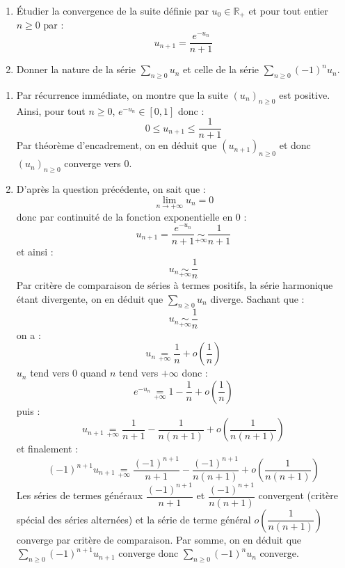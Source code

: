 \documentclass[a4paper,10pt]{report}
\newcommand{\Sum}[2]{\ensuremath{\textstyle{\sum\limits_{#1}^{#2}}}}
\begin{document}
\medskip

\begin{Exa}  
\begin{enumerate}
\item Étudier la convergence de la suite définie par $u_0 \in \mathbb{R}_+$ et pour tout entier $n \geq 0$ par :
 \[
u_{n + 1} = \frac{e^{ - u_n}}{n + 1}
 \]
\item Donner la nature de la série $\Sum{n \geq 0}{} u_n$ et celle de la série $\Sum{n \geq 0}{} (-1)^n u_n$.
\end{enumerate}
\end{Exa}

\corr 

\begin{enumerate}
\item Par récurrence immédiate, on montre que la suite $(u_n)_{n \geq 0}$ est positive. Ainsi, pour tout $n \geq 0$, $e^{-u_n} \in [0,1]$ donc :
$$ 0 \leq u_{n+1} \leq \dfrac{1}{n+1}$$
Par théorème d'encadrement, on en déduit que $(u_{n+1})_{n \geq 0}$ et donc $(u_n)_{n \geq 0}$ converge vers $0$.
\item D'après la question précédente, on sait que :
$$ \lim_{n \rightarrow + \infty} u_n = 0$$
donc par continuité de la fonction exponentielle en $0$ :
$$ u_{n+1} = \dfrac{e^{-u_n}}{n+1} \underset{+ \infty}{\sim} \dfrac{1}{n+1}$$
et ainsi :
$$ u_n \underset{+ \infty}{\sim} \dfrac{1}{n}$$
Par critère de comparaison de séries à termes positifs, la série harmonique étant divergente, on en déduit que $\Sum{n \geq 0}{} u_n$ diverge. Sachant que :
$$  u_n \underset{+ \infty}{\sim} \dfrac{1}{n}$$
on a :
$$ u_n \underset{+\infty}{=} \dfrac{1}{n} + o \left( \dfrac{1}{n} \right)$$
$u_n$ tend vers $0$ quand $n$ tend vers $+ \infty$ donc :
$$ e^{-u_n} \underset{+\infty}{=} 1 -\dfrac{1}{n} + o \left( \dfrac{1}{n} \right)$$
puis :
$$ u_{n+1} \underset{+\infty}{=} \dfrac{1}{n+1} - \dfrac{1}{n(n+1)} + o \left( \dfrac{1}{n(n+1)} \right)$$
et finalement :
$$ (-1)^{n+1} u_{n+1} \underset{+\infty}{=} \dfrac{(-1)^{n+1}}{n+1} - \dfrac{(-1)^{n+1}}{n(n+1)} + o \left( \dfrac{1}{n(n+1)} \right)$$
Les séries de termes généraux $\dfrac{(-1)^{n+1}}{n+1}$ et $\dfrac{(-1)^{n+1}}{n(n+1)}$ convergent (critère spécial des séries alternées) et la série de terme général $o \left( \dfrac{1}{n(n+1)} \right)$ converge par critère de comparaison. Par somme, on en déduit que $\Sum{n \geq 0}{} (-1)^{n+1} u_{n+1}$ converge donc $\Sum{n \geq 0}{} (-1)^n u_n$ converge.
\end{enumerate}
\end{document}
